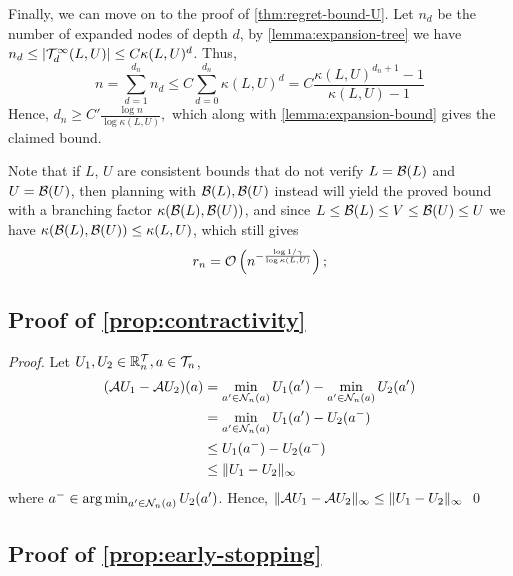 \documentclass[runningheads]{llncs}
\begin{document}
Finally, we can move on to the proof of \autoref{thm:regret-bound-U}.
Let $n_d$ be the number of expanded nodes of depth $d$, by \autoref{lemma:expansion-tree} we have $n_d \leq |\mathcal{T}^\infty_d(L,U)| \leq C\kappa(L,U)^d$. Thus, 
\[n = \sum_{d=1}^{d_n} n_d \leq C\sum_{d=0}^{d_n} \kappa(L,U)^d = C\frac{\kappa(L,U)^{d_n+1}-1}{\kappa(L,U)-1}\]
Hence, $d_n \geq C'\frac{\log n}{\log\kappa(L,U)},$ which along with \autoref{lemma:expansion-bound} gives the claimed bound.

Note that if $L,\,U$ are consistent bounds that do not verify $L = \mathcal{B}(L)$ and $U=\mathcal{B}(U)$, then planning with $\mathcal{B}(L),\mathcal{B}(U)$ instead will yield the proved bound with a branching factor $\kappa(\mathcal{B}(L),\mathcal{B}(U))$, and since $L\leq\mathcal{B}(L)\leq V\leq \mathcal{B}(U)\leq U$ we have $\kappa(\mathcal{B}(L),\mathcal{B}(U)) \leq \kappa(L,U)$, which still gives \begin{align*}
r_n = \mathcal{O}\left(n^{-\frac{\log 1/\gamma}{\log \kappa(L,U)}}\right);
\end{align*}

\subsection{Proof of \autoref{prop:contractivity}}
\begin{proof}
Let $U_1, U_2\in \mathbb{R}^{\mathcal{T}}_n, a\in\mathcal{T}_n$,
\begin{align*}
    (\mathcal{A} U_1 - \mathcal{A} U_2)(a) &= \min_{a'\in\mathcal{N}_n(a)} U_1(a') - \min_{a'\in\mathcal{N}_n(a)} U_2(a') \\
    &= \min_{a'\in\mathcal{N}_n(a)} U_1(a') - U_2(a^-) \\
    &\leq U_1(a^-) - U_2(a^-) \\
    &\leq \|U_1 - U_2\|_\infty
\end{align*}
where $a^-\in \operatorname*{arg\,min}_{a'\in\mathcal{N}_n(a)} U_2(a')$. 
Hence, $\|\mathcal{A} U_1 - \mathcal{A} U_2\|_\infty \leq \|U_1 - U_2\|_\infty$
\qed\end{proof}

\subsection{Proof of \autoref{prop:early-stopping}}
\end{document}
